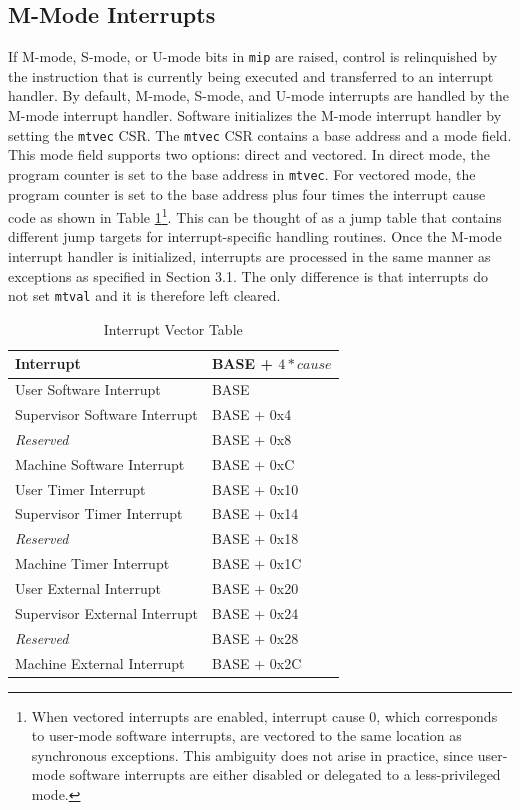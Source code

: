 \documentclass[12pt]{article}
\begin{document}
\subsection{M-Mode Interrupts}
If M-mode, S-mode, or U-mode bits in {\tt{mip}} are raised, control is relinquished by the instruction that is currently being executed and transferred to an interrupt handler. By default, M-mode, S-mode, and U-mode interrupts are handled by the M-mode interrupt handler. Software initializes the M-mode interrupt handler by setting the {\tt{mtvec}} CSR. The {\tt{mtvec}} CSR contains a base address and a mode field. This mode field supports two options: direct and vectored. In direct mode, the program counter is set to the base address in {\tt{mtvec}}. For vectored mode, the program counter is set to the base address plus four times the interrupt cause code as shown in Table \ref{interruptvectors}\footnote[4]{When vectored interrupts are enabled, interrupt cause 0, which corresponds to user-mode software interrupts, are vectored to the same location as synchronous exceptions. This ambiguity does not arise in practice, since user-mode software interrupts are either disabled or delegated to a less-privileged mode.}. This can be thought of as a jump table that contains different jump targets for interrupt-specific handling routines. Once the M-mode interrupt handler is initialized, interrupts are processed in the same manner as exceptions as specified in Section 3.1. The only difference is that interrupts do not set {\tt{mtval}} and it is therefore left cleared.

\begin{table}[h!]
\centering
\begin{tabular}{| l | l |}
\hline
Interrupt & BASE + $4*cause$ \\
\hline
User Software Interrupt & BASE \\
\hline
Supervisor Software Interrupt & BASE + 0x4 \\
\hline
\emph{Reserved} & BASE + 0x8 \\ 
\hline
Machine Software Interrupt & BASE + 0xC \\ 
\hline
User Timer Interrupt & BASE + 0x10 \\
\hline
Supervisor Timer Interrupt & BASE + 0x14 \\ 
\hline
\emph{Reserved} & BASE + 0x18 \\ 
\hline
Machine Timer Interrupt & BASE + 0x1C \\ 
\hline
User External Interrupt & BASE + 0x20 \\ 
\hline
Supervisor External Interrupt & BASE + 0x24 \\ 
\hline
\emph{Reserved} & BASE + 0x28 \\ 
\hline
Machine External Interrupt & BASE + 0x2C \\ 
\hline
\end{tabular}
\caption{Interrupt Vector Table}
\label{interruptvectors}
\end{table}
\end{document}
